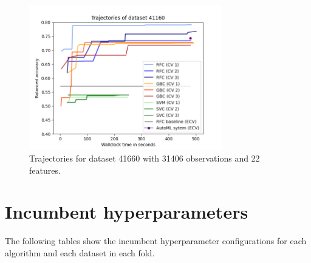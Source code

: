 \documentclass[11pt]{article}
\begin{document}
\begin{figure}[H]
 \centering
  \includegraphics[width=0.75\textwidth]{fig/plot_dataset_41160.png}
  \caption{Trajectories for dataset 41660 with 31406 observations and 22 features.}
\end{figure}

\section{Incumbent hyperparameters}

The following tables show the incumbent hyperparameter configurations for each algorithm and each dataset in each fold. 
\end{document}

